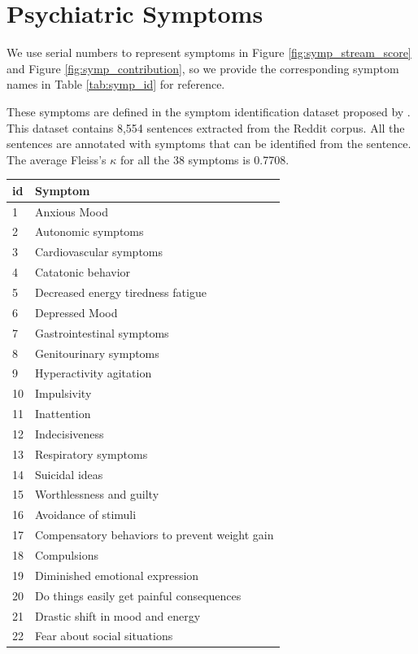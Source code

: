 \section{Psychiatric Symptoms}
\label{apd:symps}
We use serial numbers to represent symptoms in Figure \ref{fig:symp_stream_score} and Figure \ref{fig:symp_contribution}, so we provide the corresponding symptom names in Table \ref{tab:symp_id} for reference. 

These symptoms are defined in the symptom identification dataset proposed by \citet{Zhang2022SymptomIF}. This dataset contains 8,554 sentences extracted from the Reddit corpus. All the sentences are annotated with symptoms that can be identified from the sentence. The average Fleiss’s $\kappa$ for all the 38 symptoms is 0.7708.
\begin{table}[th]
    \small
    \centering
    \begin{tabular}{m{0.4cm}m{6cm}}
    \hline
    id & Symptom  \\
    \hline
    1&Anxious Mood 	\\
    2&Autonomic symptoms	\\
    3&Cardiovascular symptoms		\\
    4&Catatonic behavior\\
    5&Decreased energy tiredness fatigue	\\
    6&Depressed Mood\\
    7&Gastrointestinal symptoms	\\
    8&Genitourinary symptoms	\\
    9&Hyperactivity agitation	\\
    10&Impulsivity		\\
    11&Inattention	\\
    12&Indecisiveness	\\
    13&Respiratory symptoms\\
    14&Suicidal ideas	\\
    15&Worthlessness and guilty	\\
    16&Avoidance of stimuli	\\
    17&Compensatory behaviors to prevent weight gain	\\
    18&Compulsions		\\
    19&Diminished emotional expression		\\
    20&Do things easily get painful consequences	\\
    21&Drastic shift in mood and energy	\\
    22&Fear about social situations	\\

\end{tabular}
\end{table}
